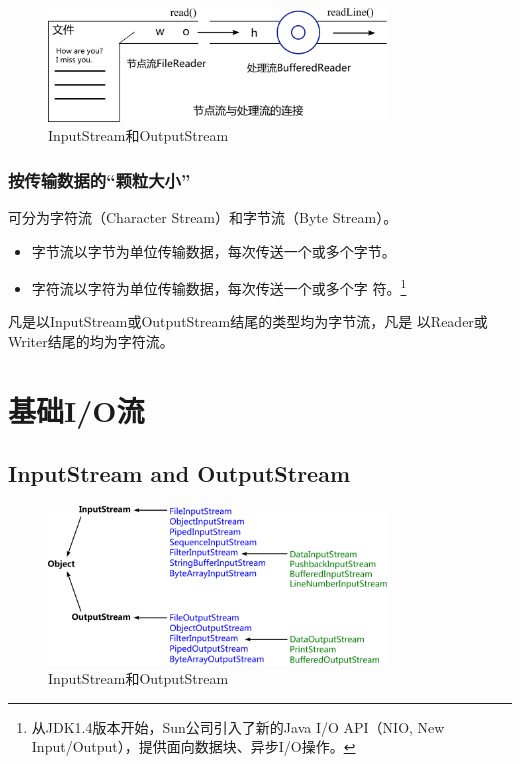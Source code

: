 \begin{figure}[htb]
  \centering
  \includegraphics[width=0.8\textwidth]{images/Advanced-IO-programming/fig-stream-link.pdf}
  \caption{InputStream和OutputStream}
  \label{fig:fig-stream-link}
\end{figure}

\subsubsection{按传输数据的“颗粒大小”}

{\hei 可分为字符流（Character Stream）和字节流（Byte Stream）。}

\begin{itemize}
\item 字节流以字节为单位传输数据，每次传送一个或多个字节。
\item 字符流以字符为单位传输数据，每次传送一个或多个字
  符。\footnote{从JDK1.4版本开始，Sun公司引入了新的Java I/O
    API（NIO, New Input/Output），提供面向数据块、异步I/O操作。}
\end{itemize}


凡是以InputStream或OutputStream结尾的类型均为{\hei 字节流}，凡是
以Reader或Writer结尾的均为{\hei 字符流。}

\section{基础I/O流}

\subsection{InputStream and OutputStream}

\begin{figure}[htb]
\centering
\includegraphics[width=0.8\textwidth]{images/Advanced-IO-programming/fig-io-input-and-output-stream.pdf}
\caption{InputStream和OutputStream}
\label{fig:fig-io-input-and-output-stream}
\end{figure}

